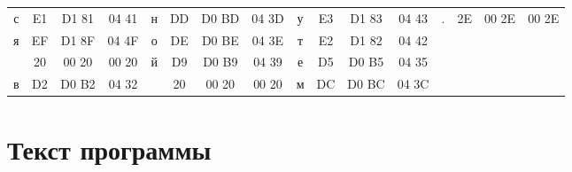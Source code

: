 {\begin{center}
\begin{tabular}{|c|c|c|c||c|c|c|c||c|c|c|c||c|c|c|c|}
			с & E1 & D1 81 & 04 41 & н & DD & D0 BD & 04 3D & у & E3 & D1 83 & 04 43 & . & 2E & 00 2E & 00 2E\\
			я & EF & D1 8F & 04 4F & о & DE & D0 BE & 04 3E & т & E2 & D1 82 & 04 42 &  &  &  & \\
			& 20 & 00 20 & 00 20 & й & D9 & D0 B9 & 04 39 & е & D5 & D0 B5 & 04 35 &  &  &  & \\
			в & D2 & D0 B2 & 04 32 &   & 20 & 00 20 & 00 20 & м & DC & D0 BC & 04 3C &  &  &  & \\
			\hline
		\end{tabular}
	\end{center}
}

\newpage
\section{Текст программы}
